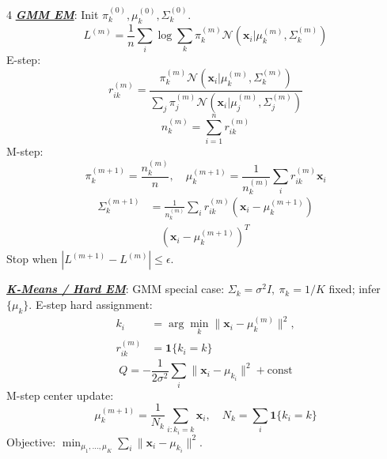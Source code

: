 \documentclass[12pt]{article}
\newcommand{\bulletPoint}[1]{\ul{\textit{\textbf{#1}}}}
\begin{document}
\begin{multicols*}{4}
\bulletPoint{GMM EM}:
Init $\pi_k^{(0)},\mu_k^{(0)},\Sigma_k^{(0)}$.
\useshortskip \begin{equation*}
    \scriptstyle L^{(m)}=\frac1n\sum_i\log\sum_k
    \pi_k^{(m)}\mathcal{N}(\mathbf{x}_i|\mu_k^{(m)},\Sigma_k^{(m)})
\end{equation*}
E-step:
\useshortskip \begin{equation*}
    \scriptstyle r_{ik}^{(m)}=
    \frac{\pi_k^{(m)}\mathcal{N}(\mathbf{x}_i|\mu_k^{(m)},\Sigma_k^{(m)})}
    {\sum_j\pi_j^{(m)}\mathcal{N}(\mathbf{x}_i|\mu_j^{(m)},\Sigma_j^{(m)})}
\end{equation*}
\useshortskip \begin{equation*}
    n_k^{(m)}=\sum_{i=1}^n r_{ik}^{(m)}
\end{equation*}
M-step:
\useshortskip \begin{equation*}
    \scriptstyle \pi_k^{(m+1)}=\frac{n_k^{(m)}}{n},\quad
    \mu_k^{(m+1)}=\frac{1}{n_k^{(m)}}\sum_i r_{ik}^{(m)}\mathbf{x}_i
\end{equation*}
\useshortskip \begin{equation*}
    \begin{split}
        \scriptstyle \Sigma_k^{(m+1)}
        &\scriptstyle =\frac{1}{n_k^{(m)}}\sum_i r_{ik}^{(m)}
        (\mathbf{x}_i-\mu_k^{(m+1)})\\
        &\scriptstyle \quad(\mathbf{x}_i-\mu_k^{(m+1)})^T
    \end{split}
\end{equation*}
Stop when $|L^{(m+1)}-L^{(m)}|\le\epsilon$.

\bulletPoint{K-Means / Hard EM}:
GMM special case: $\Sigma_k=\sigma^2I,\ \pi_k=1/K$ fixed; infer $\{\mu_k\}$.
E-step hard assignment:
\useshortskip \begin{equation*}
    \begin{split}
        k_i&=\arg\min_k\|\mathbf{x}_i-\mu_k^{(m)}\|^2,\\
        r_{ik}^{(m)}&=\mathbf{1}\{k_i=k\}
    \end{split}
\end{equation*}
\useshortskip \begin{equation*}
    \scriptstyle Q=-\frac{1}{2\sigma^2}\sum_i\|\mathbf{x}_i-\mu_{k_i}\|^2+\mathrm{const}
\end{equation*}
M-step center update:
\useshortskip \begin{equation*}
    \scriptstyle \mu_k^{(m+1)}=\frac{1}{N_k}\sum_{i:k_i=k}\mathbf{x}_i,\quad
    N_k=\sum_i\mathbf{1}\{k_i=k\}
\end{equation*}
Objective: $\min_{\mu_1,\ldots,\mu_K}\sum_i\|\mathbf{x}_i-\mu_{k_i}\|^2$.


\end{multicols*}
\end{document}
